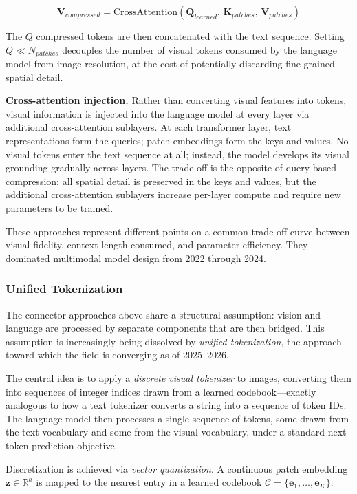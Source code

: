 \documentclass{book}
\begin{document}
\begin{equation}
\mathbf{V}_{compressed} = \text{CrossAttention}(\mathbf{Q}_{learned},\,
\mathbf{K}_{patches},\, \mathbf{V}_{patches})
\end{equation}

The $Q$ compressed tokens are then concatenated with the text sequence.
Setting $Q \ll N_{patches}$ decouples the number of visual tokens consumed
by the language model from image resolution, at the cost of potentially
discarding fine-grained spatial detail. 

\textbf{Cross-attention injection.} Rather than converting visual features
into tokens, visual information is injected into the language model at every
layer via additional cross-attention sublayers. At each transformer layer,
text representations form the queries; patch embeddings form the keys and
values. No visual tokens enter the text sequence at all; instead, the model
develops its visual grounding gradually across layers. The trade-off is the opposite of query-based
compression: all spatial detail is preserved in the keys and values, but the
additional cross-attention sublayers increase per-layer compute and require
new parameters to be trained.

These approaches represent different points on a common trade-off curve
between visual fidelity, context length consumed, and parameter efficiency.
They dominated multimodal model design from 2022 through 2024.

\subsubsection*{Unified Tokenization}

The connector approaches above share a structural assumption: vision and
language are processed by separate components that are then bridged. This
assumption is increasingly being dissolved by \emph{unified tokenization},
the approach toward which the field is converging as of 2025--2026.

The central idea is to apply a \emph{discrete visual tokenizer} to images,
converting them into sequences of integer indices drawn from a learned
codebook---exactly analogous to how a text tokenizer converts a string into
a sequence of token IDs. The language model then processes a single sequence
of tokens, some drawn from the text vocabulary and some from the visual
vocabulary, under a standard next-token prediction objective.

Discretization is achieved via \emph{vector quantization}. A continuous patch
embedding $\mathbf{z} \in \mathbb{R}^h$ is mapped to the nearest entry in a
learned codebook $\mathcal{C} = \{\mathbf{e}_1, \ldots, \mathbf{e}_K\}$:
\end{document}
